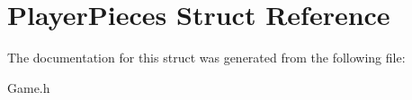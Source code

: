 \hypertarget{struct_player_pieces}{\section{Player\-Pieces Struct Reference}
\label{struct_player_pieces}
}


The documentation for this struct was generated from the following file\-:\begin{DoxyCompactItemize}
\item 
Game.\-h\end{DoxyCompactItemize}
